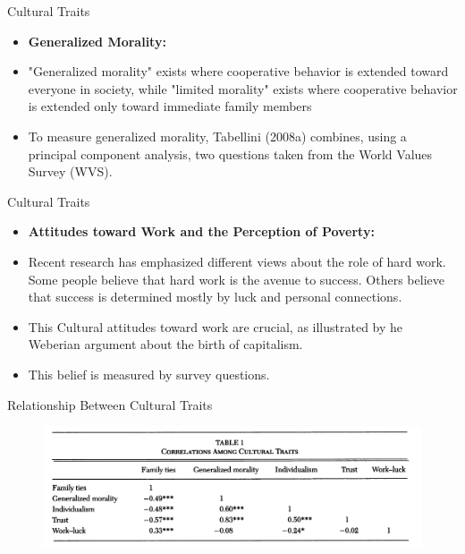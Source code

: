 \documentclass{beamer}
\begin{document}
     \begin{frame}{Cultural Traits}
    \begin{itemize}
    \item  \textbf{Generalized Morality:}
            \vspace{0.3cm}
        \pause 
        \item "Generalized morality" exists where cooperative behavior is extended
 toward everyone in society, while "limited morality" exists where cooperative behavior is extended only toward immediate family members
            \vspace{0.3cm}
        \pause 
        \item To measure generalized morality, Tabellini (2008a) combines, using a principal component analysis, two questions taken from the World Values Survey (WVS).
    \end{itemize}
        
    \end{frame}
                    \begin{frame}{Cultural Traits}
    \begin{itemize}
    \item  \textbf{Attitudes toward Work and the Perception of Poverty:}
            \vspace{0.3cm}
        \pause 
        \item Recent research has emphasized different views about the role of hard work. Some people believe that hard work is the avenue to success. Others believe that success is determined mostly by luck and personal connections.
            \vspace{0.3cm}
        \pause 
        \item This Cultural attitudes toward work are crucial, as illustrated by he Weberian argument about the birth of capitalism.

                    \vspace{0.3cm}
        \pause 
        \item  This belief is measured by survey questions.
    \end{itemize}
        
    \end{frame}

                \begin{frame}{Relationship Between Cultural Traits}
    
          \begin{figure}
        \centering
        \includegraphics[scale=0.6]{Relationship between cultural traits.PNG}

    \end{figure} 

    
    \end{frame}
\end{document}
